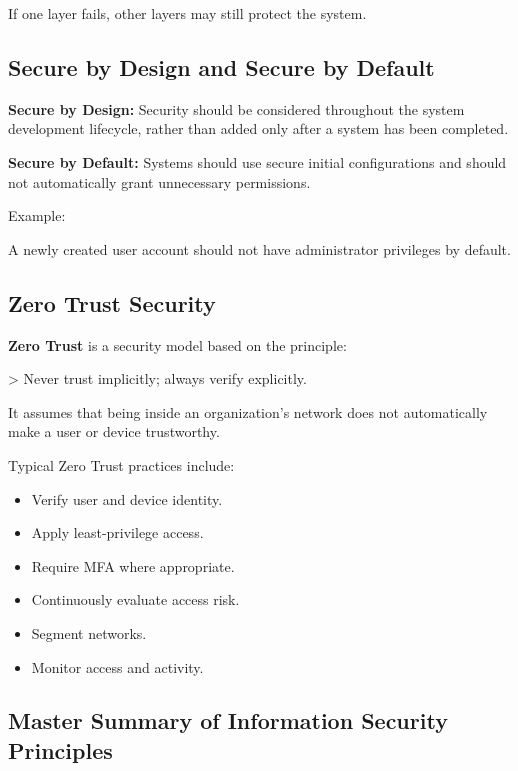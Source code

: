 If one layer fails, other layers may still protect the system.

\subsection{Secure by Design and Secure by Default}

\textbf{Secure by Design:} Security should be considered throughout the system development lifecycle, rather than added only after a system has been completed.

\textbf{Secure by Default:} Systems should use secure initial configurations and should not automatically grant unnecessary permissions.

Example:

A newly created user account should not have administrator privileges by default.

\subsection{Zero Trust Security}

\textbf{Zero Trust} is a security model based on the principle:

> Never trust implicitly; always verify explicitly.

It assumes that being inside an organization's network does not automatically make a user or device trustworthy.

Typical Zero Trust practices include:

\begin{itemize}
\item Verify user and device identity.
\item Apply least-privilege access.
\item Require MFA where appropriate.
\item Continuously evaluate access risk.
\item Segment networks.
\item Monitor access and activity.
\end{itemize}

\subsection{Master Summary of Information Security Principles}

